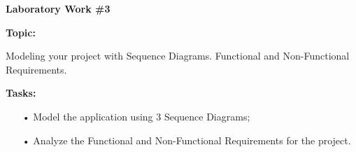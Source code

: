 \graphicspath{ {pic/} }
\begin{flushleft}
\setlength{\parindent}{2ex}\par
\textbf{Laboratory Work \#3} \par
\textbf{Topic:}\par
Modeling your project with Sequence Diagrams. Functional and Non-Functional Requirements.\par
\textbf{Tasks:}
\begin{enumerate}
\item[•] Model the application using 3 Sequence Diagrams;
\item[•] Analyze the Functional and Non-Functional Requirements for the project.
\end{enumerate}
\end{flushleft}
\clearpage

